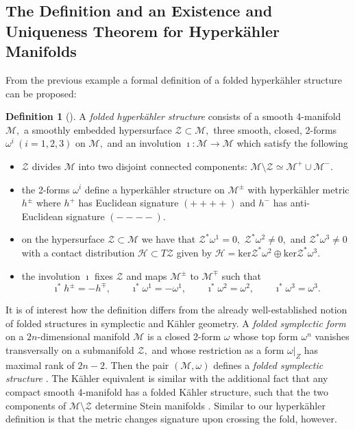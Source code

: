 \documentclass[a4paper,12pt, onecolumn, notitlepage]{article}
\theoremstyle{definition}
\newtheorem{defn}[thm]{Definition}
\theoremstyle{remark}
\newcommand{\w}{\omega}
\newcommand{\K}{K\"ahler }
\newcommand{\HK}{hyperk\"ahler }
\begin{document}
\subsection{The Definition and an Existence and Uniqueness Theorem for Hyperk\"ahler Manifolds}
From the previous example a formal definition of a folded \HK structure can be proposed:\\

\begin{defn}[\cite{hitchin_2015,biquard_2015}]
	\label{hk_def}
	A \emph{folded \HK structure} consists of a smooth 4-manifold $\mathcal{M},$ a smoothly embedded hypersurface $\mathcal{Z}\subset\mathcal{M},$ three smooth, closed, 2-forms $\w^{i}\ (i=1,2,3)$ on $\mathcal{M},$ and an involution $\imath:\mathcal{M}\to\mathcal{M}$ which satisfy the following
	\begin{itemize}
		\item $\mathcal{Z}$ divides $\mathcal{M}$ into two disjoint connected components: $\mathcal{M}\setminus \mathcal{Z}\simeq\mathcal{M}^{+}\cup\mathcal{M}^{-}.$
		\item the 2-forms $\w^{i}$ define a \HK structure on $\mathcal{M}^{\pm}$ with \HK metric $h^{\pm}$ where $h^{+}$ has Euclidean signature $(++++)$ and $h^{-}$ has anti-Euclidean signature $(----).$
		\item on the hypersurface $\mathcal{Z}\subset\mathcal{M}$ we have that $\mathcal{Z}^{\ast}\w^{1}=0,$ $\mathcal{Z}^{\ast}\w^{2}\neq0,$ and $\mathcal{Z}^{\ast}\w^{3}\neq0$ with a contact distribution $\mathcal{H}\subset T\mathcal{Z}$ given by $\mathcal{H}=\text{ker}\mathcal{Z}^{\ast}\w^{2}\oplus\text{ker}\mathcal{Z}^{\ast}\w^{3}.$
		\item the involution $\imath$ fixes $\mathcal{Z}$ and maps $\mathcal{M}^{\pm}$ to $\mathcal{M}^{\mp}$ such that
		\begin{equation}
		\label{def_involution}
		\imath^{\ast}h^{\pm} = -h^{\mp},\qquad \imath^{\ast}\w^{1} = -\w^{1},\qquad \imath^{\ast}\w^{2} = \w^{2},\qquad \imath^{\ast}\w^{3} = \w^{3}.
		\end{equation}
	\end{itemize}
\end{defn}
It is of interest how the definition differs from the already well-established notion of folded structures in symplectic and \K geometry. A \emph{folded symplectic form} on a $2n$-dimensional manifold $\mathcal{M}$ is a closed 2-form $\w$ whose top form $\w^{n}$ vanishes transversally on a submanifold $\mathcal{Z},$ and whose restriction as a form $\left.\w\right|_Z$ has maximal rank of $2n-2$. Then the pair $(\mathcal{M},\w)$ defines a \emph{folded symplectic structure} \cite{dasilva_2000}. The \K equivalent is similar with the additional fact that any compact smooth 4-manifold has a folded \K structure, such that the two components of $\mathcal{M}\setminus\mathcal{Z}$ determine Stein manifolds \cite{hitchin_1987}. Similar to our \HK definition is that the metric changes signature upon crossing the fold, however.\\
\end{document}
